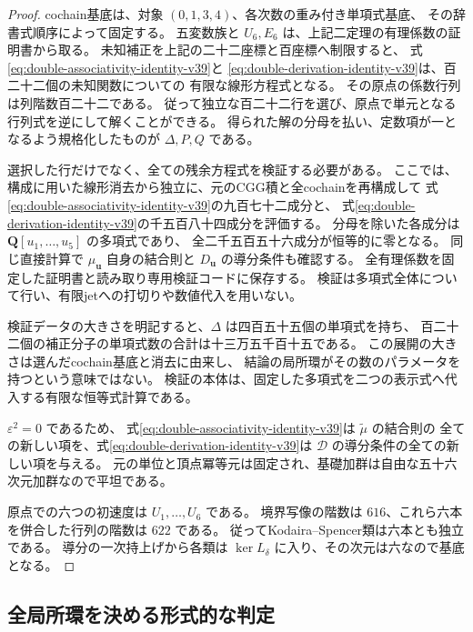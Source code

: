 \begin{proof}
cochain基底は、対象 $(0,1,3,4)$、各次数の重み付き単項式基底、
その辞書式順序によって固定する。
五変数族と $U_6,E_6$ は、上記二定理の有理係数の証明書から取る。
未知補正を上記の二十二座標と百座標へ制限すると、
式\eqref{eq:double-associativity-identity-v39}と
\eqref{eq:double-derivation-identity-v39}は、百二十二個の未知関数についての
有限な線形方程式となる。
その原点の係数行列は列階数百二十二である。
従って独立な百二十二行を選び、原点で単元となる行列式を逆にして解くことができる。
得られた解の分母を払い、定数項が一となるよう規格化したものが
$\Delta,P,Q$ である。

選択した行だけでなく、全ての残余方程式を検証する必要がある。
ここでは、構成に用いた線形消去から独立に、元のCGG積と全cochainを再構成して
式\eqref{eq:double-associativity-identity-v39}の九百七十二成分と、
式\eqref{eq:double-derivation-identity-v39}の千五百八十四成分を評価する。
分母を除いた各成分は $\mathbf Q[u_1,\ldots,u_5]$ の多項式であり、
全二千五百五十六成分が恒等的に零となる。
同じ直接計算で $\mu_{\boldsymbol u}$ 自身の結合則と
$D_{\boldsymbol u}$ の導分条件も確認する。
全有理係数を固定した証明書と読み取り専用検証コードに保存する。
検証は多項式全体について行い、有限jetへの打切りや数値代入を用いない。

検証データの大きさを明記すると、$\Delta$ は四百五十五個の単項式を持ち、
百二十二個の補正分子の単項式数の合計は十三万五千百十五である。
この展開の大きさは選んだcochain基底と消去に由来し、
結論の局所環がその数のパラメータを持つという意味ではない。
検証の本体は、固定した多項式を二つの表示式へ代入する有限な恒等式計算である。

$\varepsilon^2=0$ であるため、
式\eqref{eq:double-associativity-identity-v39}は $\widetilde\mu$ の結合則の
全ての新しい項を、式\eqref{eq:double-derivation-identity-v39}は
$\mathcal D$ の導分条件の全ての新しい項を与える。
元の単位と頂点冪等元は固定され、基礎加群は自由な五十六次元加群なので平坦である。

原点での六つの初速度は $U_1,\ldots,U_6$ である。
境界写像の階数は $616$、これら六本を併合した行列の階数は $622$ である。
従ってKodaira--Spencer類は六本とも独立である。
導分の一次持上げから各類は $\ker L_\delta$ に入り、その次元は六なので基底となる。
\end{proof}

\subsection{全局所環を決める形式的な判定}


